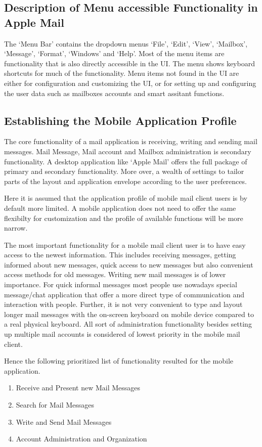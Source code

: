 \documentclass[a4paper,11pt,twoside]{article}
\begin{document}
\subsection{Description of Menu accessible Functionality in Apple Mail}
The `Menu Bar' contains the dropdown menus `File', `Edit', `View', `Mailbox',
`Message', `Format', `Windows' and `Help'. Most of the menu items are functionality
that is also directly accessible in the UI. The menu shows keyboard shortcuts for
much of the functionality. Menu items not found in the UI are either for
configuration and customizing the UI, or for setting up and configuring the user
data such as mailboxes accounts and smart assitant functions.


\subsection{Establishing the Mobile Application Profile}
The core functionality of a mail application is receiving, writing and sending
mail messages. Mail Message, Mail account and Mailbox administration is
secondary functionality. A desktop application like `Apple Mail' offers the
full package of primary and secondary functionality. More over, a wealth of
settings to tailor parts of the layout and application envelope according to the
user preferences.

Here it is assumed that the application profile of mobile
mail client users is by default more limited. A mobile application does not need
to offer the same flexibilty for customization and the profile of available
functions will be more narrow.

The most important functionality for a mobile mail client user is to have easy
access to the newest information. This includes receiving messages, getting
informed about new messages, quick access to new messages but also convenient
access methods for old messages. Writing new mail messages is of lower
importance. For quick informal messages most people use nowadays special
message/chat application that offer a more direct type of communication and
interaction with people. Further, it is not very convenient to type and layout
longer mail messages with the on-screen keyboard on mobile device compared to a
real physical keyboard. All sort of administration functionality besides setting
up multiple mail accounts is considered of lowest priority in the mobile mail
client.

Hence the following prioritized list of functionality resulted for the mobile
application.
\begin{enumerate}
  \item Receive and Present new Mail Messages
  \item Search for Mail Messages
  \item Write and Send Mail Messages
  \item Account Administration and Organization
\end{enumerate}
\end{document}
